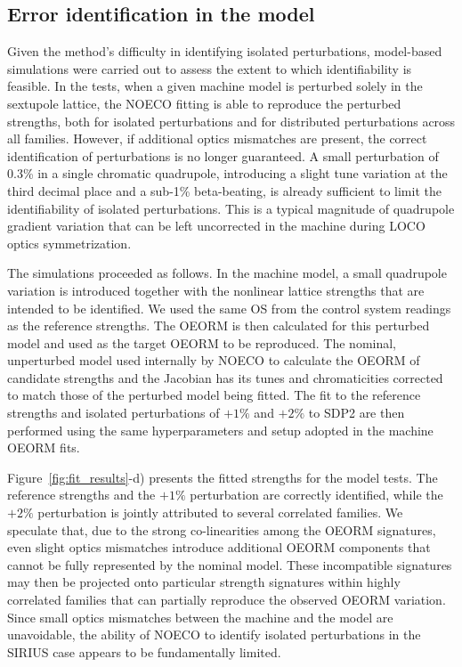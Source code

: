 \documentclass[%
               ]{jacow}
\begin{document}
\subsection{Error identification in the model}
Given the method's difficulty in identifying isolated perturbations, model-based simulations were carried out to assess the extent to which identifiability is feasible. In the tests, when a given machine model is perturbed solely in the sextupole lattice, the NOECO fitting is able to reproduce the perturbed strengths, both for isolated perturbations and for distributed perturbations across all families. However, if additional optics mismatches are present, the correct identification of perturbations is no longer guaranteed. A small perturbation of 0.3\% in a single chromatic quadrupole, introducing a slight tune variation at the third decimal place and a sub-1\% beta-beating, is already sufficient to limit the identifiability of isolated perturbations. This is a typical magnitude of quadrupole gradient variation that can be left uncorrected in the machine during LOCO optics symmetrization.

The simulations proceeded as follows. In the machine model, a small quadrupole variation is introduced together with the nonlinear lattice strengths that are intended to be identified. We used the same OS from the control system readings as the reference strengths.  The OEORM is then calculated for this perturbed model and used as the target OEORM to be reproduced. The nominal, unperturbed model used internally by NOECO to calculate the OEORM of candidate strengths and the Jacobian has its tunes and chromaticities corrected to match those of the perturbed model being fitted. The fit to the reference strengths and isolated perturbations of $+1\%$ and $+2\%$ to SDP2 are then performed using the same hyperparameters and setup adopted in the machine OEORM fits. 

Figure~\ref{fig:fit_results}-d) presents the fitted strengths for the model tests. The reference strengths and the $+1\%$ perturbation are correctly identified, while the $+2\%$ perturbation is jointly attributed to several correlated families. We speculate that, due to the strong co-linearities among the OEORM signatures, even slight optics mismatches introduce additional OEORM components that cannot be fully represented by the nominal model. These incompatible signatures may then be projected onto particular strength signatures within highly correlated families that can partially reproduce the observed OEORM variation. Since small optics mismatches between the machine and the model are unavoidable, the ability of NOECO to identify isolated perturbations in the SIRIUS case appears to be fundamentally limited.
\end{document}
